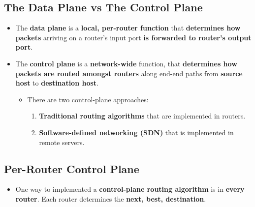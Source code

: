 \documentclass[16pt]{article}
\begin{document}
    \subsection*{The Data Plane vs The Control Plane}
    \begin{itemize}
        \item The \textbf{data plane} is a \textbf{local, per-router function} that \textbf{determines how packets} arriving on a router's input port \textbf{is forwarded to router's output port}.
        \item The \textbf{control plane} is a \textbf{network-wide} function, that \textbf{determines how packets are routed amongst routers} along end-end paths from \textbf{source host} to \textbf{destination host}.
        \begin{itemize}
            \item There are two control-plane approaches:
            \begin{enumerate}
                \item \textbf{Traditional routing algorithms} that are implemented in routers.
                \item \textbf{Software-defined networking (SDN)} that is implemented in remote servers.
            \end{enumerate}
        \end{itemize}
    \end{itemize}

    \subsection*{Per-Router Control Plane}
    \begin{itemize}
        \item One way to implemented a \textbf{control-plane routing algorithm} is in \textbf{every router}. Each router determines the \textbf{next, best, destination}. 
    \end{itemize}
\end{document}
